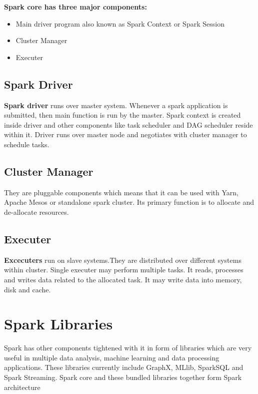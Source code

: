 {\bf Spark core has three major components:}

\begin{itemize}
   \item Main driver program also known as Spark Context or Spark Session 
   \item Cluster Manager
   \item Executer
\end{itemize}

\subsection{Spark Driver}

{\bf Spark driver} runs over master system. Whenever a spark application is submitted, then main function
is run by the master. Spark context is created inside driver and other components like task
scheduler and DAG scheduler reside within it. Driver runs over master node and negotiates with
cluster manager to schedule tasks.

\subsection{Cluster Manager}

They are pluggable components which means that it can be used with Yarn, Apache Mesos or standalone
spark cluster. Its primary function is to allocate and de-allocate resources.


\subsection{Executer}

{\bf Excecuters} run on slave systems.They are distributed over different systems within cluster. Single
executer may perform multiple tasks. It reads, processes and writes data related to the allocated
task. It may write data into memory, disk and cache.

\section{Spark Libraries}

Spark has other components tightened with it in form of libraries which are very useful in
multiple data analysis, machine learning and data processing applications. These libraries currently
include GraphX, MLlib, SparkSQL and Spark Streaming. Spark core and these bundled libraries
together form Spark architecture

